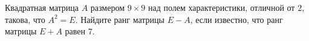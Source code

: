 \documentclass[14pt]{article}
\begin{document}
Квадратная матрица $A$ размером $9\times 9$ над полем характеристики, отличной от $2$, такова, что $A^2=E$. Найдите ранг матрицы $E-A$, если известно, что ранг матрицы $E+A$ равен $7$.
\end{document}

